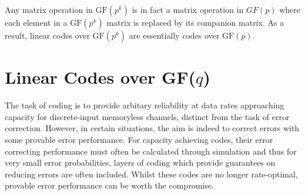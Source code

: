\documentclass[]{book}
\newcommand{\ix}[1]{%
  \leavevmode %
  \marginpar{\small\emph{#1}}%
}
\begin{document}
\ix{Matrix Operations}Any matrix operation in $\text{GF}(p^k)$ is in fact a matrix operation in $GF(p)$ where each element in a $\text{GF}(p^k)$ matrix is replaced by its companion matrix. As a result, linear codes over $\text{GF}(p^k)$ are essentially codes over $\text{GF}(p)$.

\chapter{Linear Codes over GF($q$)}
The task of coding is to provide arbitary reliability at data rates approaching capacity for discrete-input memoryless channels, distinct from the task of error correction. However, in certain situations, the aim is indeed to correct errors with some provable error performance. For capacity achieving codes, their error correcting performance must often be calculated through simulation and thus for very small error probabilities, layers of coding which provide guarantees on reducing errors are often included. Whilst these codes are no longer rate-optimal, provable error performance can be worth the compromise. 
\end{document}
